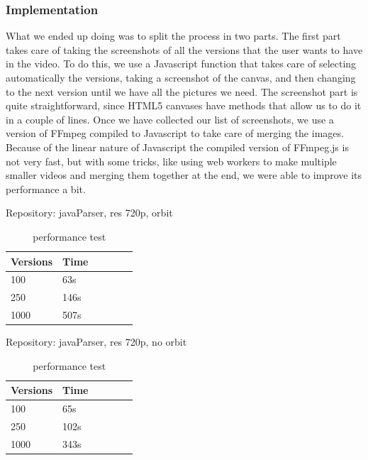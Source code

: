 \documentclass[]{usiinfbachelorproject}
\begin{document}
\subsubsection{Implementation} \label{Implementation}

What we ended up doing was to split the process in two parts.
The first part takes care of taking the screenshots of all the versions that the user wants to have in the video. To do this, we use a Javascript function that takes care of selecting automatically the versions, taking a screenshot of the canvas, and then changing to the next version until we have all the pictures we need. The screenshot part is quite straightforward, since HTML5 canvases have methods that allow us to do it in a couple of lines.
Once we have collected our list of screenshots, we use a version of FFmpeg compiled to Javascript to take care of merging the images. Because of the linear nature of Javascript the compiled version of FFmpeg.js is not very fast, but with some tricks, like using web workers to make multiple smaller videos and merging them together at the end, we were able to improve its performance a bit.

Repository: javaParser, res 720p, orbit
\begin{table}[H]
    \begin{center}
        \begin{tabular}{ | l | l | l | l | l | l |}
        \hline
        Versions & Time \\ \hline
        100 & 63s\\ \hline
        250 & 146s\\ \hline
        1000 & 507s\\ \hline
        \end{tabular}
    \end{center}
    \caption{performance test}
    \label{tab:performance}
\end{table}

Repository: javaParser, res 720p, no orbit
\begin{table}[H]
    \begin{center}
        \begin{tabular}{ | l | l | l | l | l | l |}
        \hline
        Versions & Time \\ \hline
        100 & 65s\\ \hline
        250 & 102s\\ \hline
        1000 & 343s\\ \hline
        \end{tabular}
    \end{center}
    \caption{performance test}
    \label{tab:performance}
\end{table}
\end{document}

